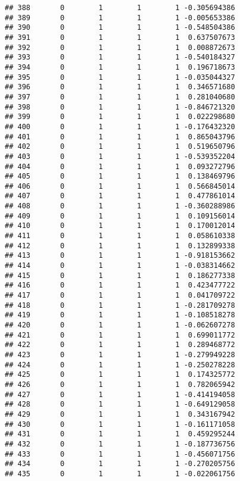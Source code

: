 \documentclass[]{book}
\theoremstyle{definition}
\theoremstyle{definition}
\theoremstyle{definition}
\theoremstyle{remark}
\begin{document}
\begin{verbatim}
## 388       0        1        1        1 -0.305694386
## 389       0        1        1        1 -0.005653386
## 390       0        1        1        1 -0.548504386
## 391       0        1        1        1  0.637507673
## 392       0        1        1        1  0.008872673
## 393       0        1        1        1 -0.540184327
## 394       0        1        1        1  0.196718673
## 395       0        1        1        1 -0.035044327
## 396       0        1        1        1  0.346571680
## 397       0        1        1        1  0.281040680
## 398       0        1        1        1 -0.846721320
## 399       0        1        1        1  0.022298680
## 400       0        1        1        1 -0.176432320
## 401       0        1        1        1  0.865043796
## 402       0        1        1        1  0.519650796
## 403       0        1        1        1 -0.539352204
## 404       0        1        1        1  0.093272796
## 405       0        1        1        1  0.138469796
## 406       0        1        1        1  0.566845014
## 407       0        1        1        1  0.477861014
## 408       0        1        1        1 -0.360288986
## 409       0        1        1        1  0.109156014
## 410       0        1        1        1  0.170012014
## 411       0        1        1        1  0.058610338
## 412       0        1        1        1  0.132899338
## 413       0        1        1        1 -0.918153662
## 414       0        1        1        1 -0.038314662
## 415       0        1        1        1  0.186277338
## 416       0        1        1        1  0.423477722
## 417       0        1        1        1  0.041709722
## 418       0        1        1        1 -0.281709278
## 419       0        1        1        1 -0.108518278
## 420       0        1        1        1 -0.062607278
## 421       0        1        1        1  0.699011772
## 422       0        1        1        1  0.289468772
## 423       0        1        1        1 -0.279949228
## 424       0        1        1        1 -0.250278228
## 425       0        1        1        1  0.174325772
## 426       0        1        1        1  0.782065942
## 427       0        1        1        1 -0.414194058
## 428       0        1        1        1 -0.649129058
## 429       0        1        1        1  0.343167942
## 430       0        1        1        1 -0.161171058
## 431       0        1        1        1  0.459295244
## 432       0        1        1        1 -0.187736756
## 433       0        1        1        1 -0.456071756
## 434       0        1        1        1 -0.270205756
## 435       0        1        1        1 -0.022061756

\end{verbatim}
\end{document}
